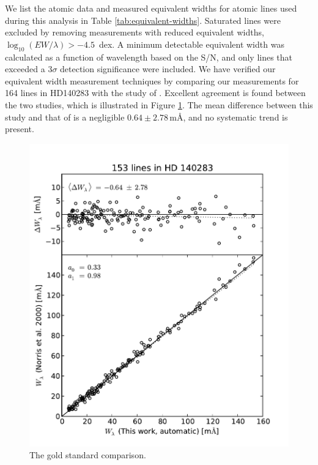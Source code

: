 \documentclass{emulateapj}
\begin{document}
We list the atomic data and measured equivalent widths for atomic lines used during this analysis in Table \ref{tab:equivalent-widths}. Saturated lines were excluded by removing measurements with reduced equivalent widths, $\log_{10}{(EW/\lambda)} > -4.5$\, dex. A minimum detectable equivalent width was calculated as a function of wavelength based on the S/N, and only lines that exceeded a $3\sigma$ detection significance were included. We have verified our equivalent width measurement techniques by comparing our measurements for 164 lines in HD140283 with the study of \citet{Norris;et-al_1996}. Excellent agreement is found between the two studies, which is illustrated in Figure \ref{fig:ew-compare}. The mean difference between this study and that of \cite{norris;et-al_1996} is a negligible $0.64 \pm 2.78$\,m\AA{}, and no systematic trend is present.

\begin{figure}[h]
	\includegraphics[width=\columnwidth]{./figures/smh-norris.pdf}
	\caption{The gold standard comparison.}
	\label{fig:ew-compare}
\end{figure}
\end{document}
